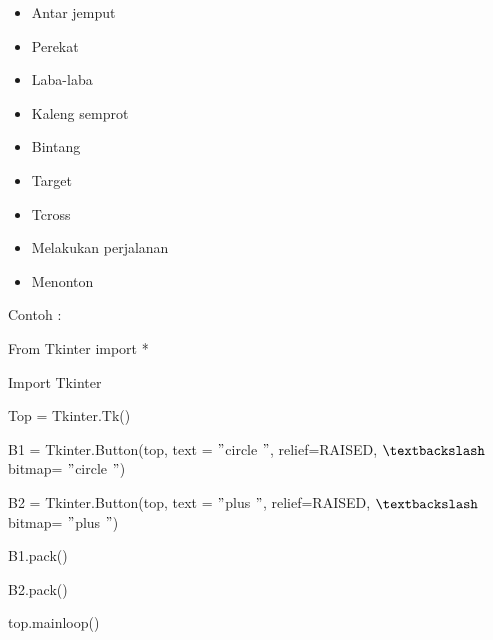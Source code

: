 \documentclass{wileySix}
\begin{document}
\begin{myEnumerate}
{\begin{myEnumerate}
\begin{itemize}
		\noindent 
		\item Antar jemput \par
		\noindent 
		\item Perekat \par
		\noindent 
		\item Laba-laba \par
		\noindent 
		\item Kaleng semprot \par
		\noindent 
		\item Bintang \par
		\noindent 
		\item Target \par
		\noindent 
		\item Tcross \par
		\noindent 
		\item Melakukan perjalanan \par
		\noindent 
		\item Menonton\end{itemize}
	\par
	\vspace{12pt}
	Contoh : \par
	{\fontsize{10pt}{10pt}\selectfont From Tkinter import *} \par
	{\fontsize{10pt}{10pt}\selectfont Import Tkinter} \par
	\vspace{10pt}
	{\fontsize{10pt}{10pt}\selectfont Top = Tkinter.Tk()} \par
	\vspace{10pt}
	{\fontsize{10pt}{10pt}\selectfont B1 = Tkinter.Button(top, text = $ " $circle $ " $, relief=RAISED,  $  \textbackslash  $ bitmap= $ " $circle $ " $)} \par
	{\fontsize{10pt}{10pt}\selectfont B2 = Tkinter.Button(top, text = $ " $plus $ " $, relief=RAISED,  $  \textbackslash  $ bitmap= $ " $plus $ " $)} \par
	\vspace{10pt}
	{\fontsize{10pt}{10pt}\selectfont B1.pack()} \par
	{\fontsize{10pt}{10pt}\selectfont B2.pack()} \par
	{\fontsize{10pt}{10pt}\selectfont top.mainloop()} \par
	\vspace{10pt}
	\noindent 


\end{myEnumerate}}
\end{myEnumerate}
\end{document}
